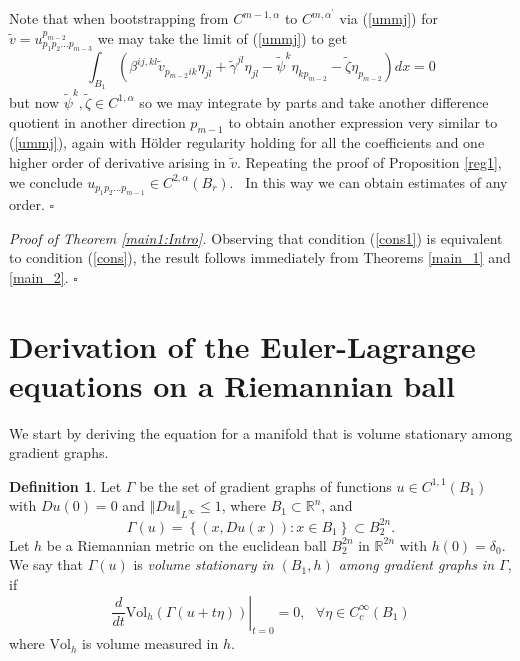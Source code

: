 \documentclass[12pt,leqno]{amsart}%
\theoremstyle{plain}
\numberwithin{equation}{section}
\theoremstyle{definition}
\newtheorem{definition}{Definition}
\begin{document}
Note that when bootstrapping from $C^{m-1,\alpha}$ to $C^{m,\alpha^{\prime}}$
via (\ref{ummj}) for $\tilde{v}= u_{p_{1} p_{2} ... p_{m-3}}^{p_{m-2}} $ we
may take the limit of (\ref{ummj}) to get
\[
\int_{B_{1}}\left(  \beta^{ij,kl}\tilde{v}_{p_{m-2} ik}\eta_{jl}+\tilde
{\gamma}^{jl}\eta_{jl}-\tilde{\psi}^{k}\eta_{kp_{m-2}}-\tilde{\zeta}%
\eta_{p_{m-2}}\right)  dx=0
\]
but now $\tilde{\psi}^{k},\tilde{\zeta}\in C^{1,\alpha}$ so we may integrate
by parts and take another difference quotient in another direction $p_{m-1}$
to obtain another expression very similar to (\ref{ummj}), again with
H\"{o}lder regularity holding for all the coefficients and one higher order of
derivative arising in $\tilde{v}.$ Repeating the proof of Proposition
\ref{reg1}, we conclude $u_{p_{1} p_{2} ... p_{m-1}}\in C^{2,\alpha}(B_{r})$.
\ In this way we can obtain estimates of any order.
\hfill$\square$


\begin{comment}
\begin{proof} \textit{of Theorem \ref{main_reg_t}:} \\
The proof follows immediately from Theorems \ref{main_1} and \ref{main_2}.
\end{proof}
\end{comment}


\medskip

\noindent\textit{Proof of Theorem \ref{main1:Intro}.} Observing that condition
(\ref{cons1}) is equivalent to condition (\ref{cons}), the result follows
immediately from Theorems \ref{main_1} and \ref{main_2}.
\hfill$\square$


\section{Derivation of the Euler-Lagrange equations on a Riemannian ball}

\label{sec_EL}

We start by deriving the equation for a manifold that is volume stationary
among gradient graphs.

\begin{definition}
Let $\Gamma$ be the set of gradient graphs of functions $u\in C^{1,1}(B_{1})$
with $Du(0)=0$ and $\left\Vert Du \right\Vert _{L^{\infty}} \leq1$, where
$B_{1}\subset\mathbb{R}^{n}$, and
\[
\Gamma(u)=\left\{  \left(  x,Du\left(  x\right)  \right)  :x\in B_{1}\right\}
\subset B_{2}^{2n}.
\]
Let $h$ be a Riemannian metric on the euclidean ball $B_{2}^{2n}$ in
$\mathbb{R}^{2n}$ with $h\left(  0\right)  =\delta_{0}$. We say that
$\Gamma(u)$ is \textit{volume stationary in $(B_{1},h)$ among gradient graphs
in $\Gamma$}, if
\[
\left.  \frac{d}{dt}\mbox{Vol}_{h}(\Gamma(u+t\eta))\right|  _{t=0}=0,
\ \ \ \forall\eta\in C^{\infty}_{c}(B_{1})
\]
where $\mbox{Vol}_{h}$ is volume measured in $h$.
\end{definition}
\end{document}
